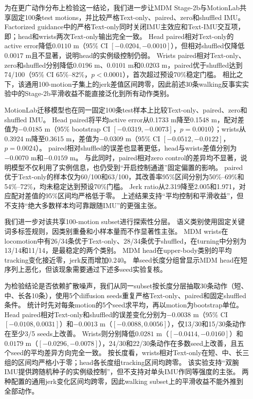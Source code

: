为在更广动作分布上检验这一结论，我们进一步让MDM Stage-2b与MotionLab共享固定100条test motions，并比较严格Text-only、paired、zero和shuffled IMU。
Factorized guidance中的严格Text-only同时关闭IMU主效应和Text-IMU交互项，即\texttt{}；head和wrists两次Text-only输出完全一致。
Head paired相对Text-only的active error降低$0.0110$ m（95\% CI $[-0.0204,-0.0010]$），但相对shuffled仅降低$0.0017$ m且不显著，说明head的实例级控制仍弱。
Wrists paired相对Text-only、zero和shuffled分别降低$0.0196$ m、$0.0101$ m和$0.0203$ m，paired优于shuffled达到74/100（95\% CI 65\%--82\%，$p<0.0001$），首次超过预设70\%稳定门槛。
相比之下，该通用100-motion子集上的jerk差值区间跨零，因此前述30条walking反事实实验中的Stage-2b平滑收益不能直接泛化到所有动作类别。

MotionLab迁移模型也在同一固定100条test样本上比较Text-only、paired、zero和shuffled IMU。
Head paired将平均active error从0.1733 m降至0.1548 m，配对差值为$-0.0185$ m（95\% bootstrap CI $[-0.0319,-0.0073]$，$p=0.0010$）；wrists从0.3924 m降至0.3615 m，差值为$-0.0309$ m（95\% CI $[-0.0512,-0.0122]$，$p=0.0024$）。
paired相对shuffled的误差也显著更低，head与wrists差值分别为$-0.0070$ m和$-0.0159$ m。
与此同时，paired相对zero control的差异均不显著，说明模型不仅利用了实例信息，也仍受到“开启控制通道”固定偏置的影响。
paired优于Text-only的样本仅为60/100和63/100，其改善率95\%区间分别为50\%--69\%和54\%--72\%，均未稳定达到预设70\%门槛。
Jerk ratio从2.319降至2.005和1.971，对应配对差值的95\%区间均严格低于零。
上述结果支持“平均控制和平滑收益”，但不支持“绝大多数样本均可靠跟随IMU”的更强主张。

我们进一步对该共享100-motion subset进行探索性分层。
语义类别使用固定关键词多标签规则，因类别重叠和小样本量而不作显著性主张。
MDM wrists在locomotion中有26/34条优于Text-only、28/34条优于shuffled，在turning中分别为13/14和11/14，是最稳定的两个类别。
MDM head在upper-body类别的平均tracking变化接近零，jerk反而增加0.240。
单seed长度分组曾显示MDM head在短序列上恶化，但该现象需要通过下述多seed实验复核。

为检验结论是否依赖扩散噪声，我们从同一subset按长度分层抽取30条动作（短、中、长各10条），使用5个diffusion seeds重复严格Text-only、paired和固定shuffled条件。
统计时先对每条motion的5个seed求平均，再以motion为bootstrap单位。
Head paired相对Text-only和shuffled的误差变化分别为$-0.0038$ m（95\% CI $[-0.0108,0.0031]$）和$-0.0013$ m（$[-0.0088,0.0056]$），仅13/30和15/30条动作在至少3/5 seeds上改善。
Wrists则分别降低$0.0281$ m（$[-0.0414,-0.0160]$）和$0.0179$ m（$[-0.0296,-0.0078]$），24/30和22/30条动作在多数seed上改善，且五个seed的平均差异方向完全一致。
按长度看，wrists相对Text-only在短、中、长三组的区间均严格小于零；head各长度组tracking区间均跨零。
该实验支持“双腕IMU提供跨随机种子的实例级控制”，但不支持对单头IMU作同等强度的主张。
两种配置的通用jerk变化区间均跨零，因此walking subset上的平滑收益不能外推到全部动作。

